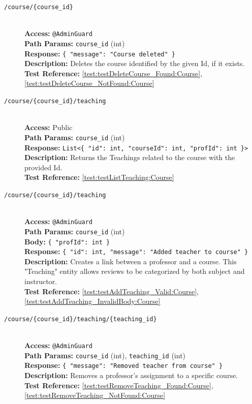 \begin{description}
	\item[\DELETE \quad \texttt{/course/\{course\_id\}}] \hfill \\
	\textbf{Access:} \texttt{@AdminGuard} \\
	\textbf{Path Params:} \texttt{course\_id} (int) \\
	\textbf{Response:} \texttt{\{ "message": "Course deleted" \}} \\
	\textbf{Description:} Deletes the course identified by the given Id, if it exists.\\
	\textbf{Test Reference:} \ref{test:testDeleteCourse_Found:Course}, \ref{test:testDeleteCourse_NotFound:Course}
	
	\item[\GET \quad \texttt{/course/\{course\_id\}/teaching}] \hfill \\
	\textbf{Access:} Public \\
	\textbf{Path Params:} \texttt{course\_id} (int) \\
	\textbf{Response:} \texttt{List<\{ "id": int, "courseId": int, "profId": int \}>} \\
	\textbf{Description:} Returns the Teachings related to the course with the provided Id.\\
	\textbf{Test Reference:} \ref{test:testListTeaching:Course}
	
	\item[\POST \quad \texttt{/course/\{course\_id\}/teaching}] \hfill \\
	\textbf{Access:} \texttt{@AdminGuard} \\
	\textbf{Path Params:} \texttt{course\_id} (int) \\
	\textbf{Body:} \texttt{\{ "profId": int \}} \\
	\textbf{Response:} \texttt{\{ "id": int, "message": "Added teacher to course" \}} \\
	\textbf{Description:} Creates a link between a professor and a course. This "Teaching" entity allows reviews to be categorized by both subject and instructor.\\
	\textbf{Test Reference:} \ref{test:testAddTeaching_Valid:Course}, \ref{test:testAddTeaching_InvalidBody:Course}
	
	\item[\DELETE \quad \texttt{/course/\{course\_id\}/teaching/\{teaching\_id\}}] \hfill \\
	\textbf{Access:} \texttt{@AdminGuard} \\
	\textbf{Path Params:} \texttt{course\_id} (int), \texttt{teaching\_id} (int) \\
	\textbf{Response:} \texttt{\{ "message": "Removed teacher from course" \}} \\
	\textbf{Description:} Removes a professor's assignment to a specific course.\\
	\textbf{Test Reference:} \ref{test:testRemoveTeaching_Found:Course}, \ref{test:testRemoveTeaching_NotFound:Course}
\end{description}

